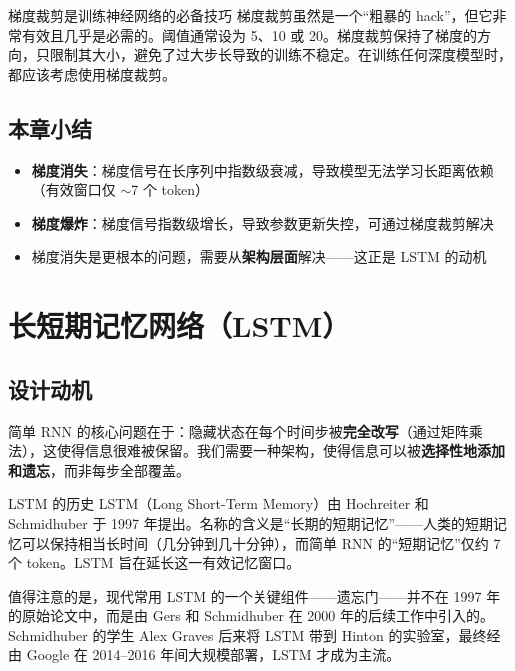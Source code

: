 \documentclass[a4paper]{article}
\begin{document}



\begin{importantbox}{梯度裁剪是训练神经网络的必备技巧}
梯度裁剪虽然是一个``粗暴的 hack''，但它非常有效且几乎是必需的。阈值通常设为 5、10 或 20。梯度裁剪保持了梯度的方向，只限制其大小，避免了过大步长导致的训练不稳定。在训练任何深度模型时，都应该考虑使用梯度裁剪。
\end{importantbox}

\subsection{本章小结}

\begin{itemize}
    \item \textbf{梯度消失}：梯度信号在长序列中指数级衰减，导致模型无法学习长距离依赖（有效窗口仅 $\sim$7 个 token）
    \item \textbf{梯度爆炸}：梯度信号指数级增长，导致参数更新失控，可通过梯度裁剪解决
    \item 梯度消失是更根本的问题，需要从\textbf{架构层面}解决——这正是 LSTM 的动机
\end{itemize}


\section{长短期记忆网络（LSTM）}

\subsection{设计动机}

简单 RNN 的核心问题在于：隐藏状态在每个时间步被\textbf{完全改写}（通过矩阵乘法），这使得信息很难被保留。我们需要一种架构，使得信息可以被\textbf{选择性地添加和遗忘}，而非每步全部覆盖。





\begin{knowledgebox}{LSTM 的历史}
LSTM（Long Short-Term Memory）由 Hochreiter 和 Schmidhuber 于 1997 年提出。名称的含义是``长期的短期记忆''——人类的短期记忆可以保持相当长时间（几分钟到几十分钟），而简单 RNN 的``短期记忆''仅约 7 个 token。LSTM 旨在延长这一有效记忆窗口。

值得注意的是，现代常用 LSTM 的一个关键组件——遗忘门——并不在 1997 年的原始论文中，而是由 Gers 和 Schmidhuber 在 2000 年的后续工作中引入的。Schmidhuber 的学生 Alex Graves 后来将 LSTM 带到 Hinton 的实验室，最终经由 Google 在 2014--2016 年间大规模部署，LSTM 才成为主流。
\end{knowledgebox}
\end{document}
